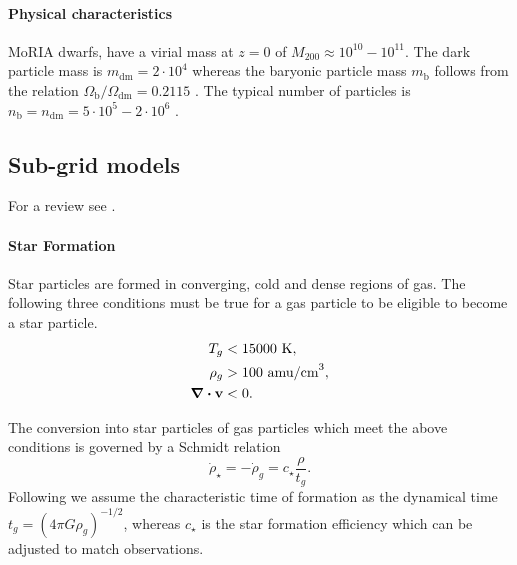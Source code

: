 \paragraph{Physical characteristics} MoRIA dwarfs, have a virial mass at $z=0$ of $M_{200} \approx 10^{10} - 10^{11}$\Msun{}. The dark particle mass is $m_{\mathrm{dm}} = 2 \cdot 10^4$ \Msun{} whereas the baryonic particle mass $m_{\mathrm{b}}$ follows from the relation $\Omega_\mathrm{b}/\Omega_{\mathrm{dm}} = 0.2115$ \citep{Planck2015}.
The typical number of particles is $n_\mathrm{b} = n_{\mathrm{dm}} = 5 \cdot 10^5 - 2 \cdot 10^6$ \Msun{}.

\subsection{Sub-grid models}
For a review see \citet{Verbeke2017, Vandenbroucke2016}.

\paragraph{Star Formation}
\label{sec:star_formation}
Star particles are formed in converging, cold and dense regions of gas.
The following three conditions must be true for a gas particle to be eligible to become a star particle.
\begin{align*}
 T_g &< 15000 \text{~K},\\
 \rho_g &> 100 \text{~amu/cm}^{3},\\
 \div \boldsymbol{\mathbf{v}} & < 0.
\end{align*}

The conversion into star particles of gas particles which meet the above conditions is governed by a Schmidt relation \citep{Schmidt1959}
\begin{equation}
\dot{\rho}_\star = -\dot{\rho}_g = c_\star \frac{\rho}{t_g}.
\label{eq:schmidt_relation}
\end{equation}
Following \citet{Stinson2006} we assume the characteristic time of formation as the dynamical time $t_g = (4 \pi G \rho_g)^{-1/2}$, whereas $c_\star$ is the star formation efficiency which can be adjusted to match observations.

